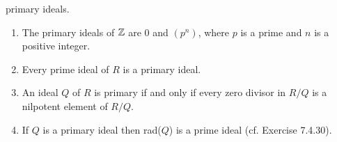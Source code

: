 \begin{enumerate}
                  primary ideals.
                  \begin{enumerate}
                     \item The primary ideals of $\mathbb{Z}$ are 0 and $(p^n)$, where
                           $p$ is a prime and $n$ is a positive integer.
                     \item Every prime ideal of $R$ is a primary ideal.
                     \item An ideal $Q$ of $R$ is primary if and only if every
                           zero divisor in $R/Q$ is a nilpotent element of
                           $R/Q$.
                     \item If $Q$ is a primary ideal then rad($Q$) is a prime
                           ideal (cf. Exercise 7.4.30).
                  \end{enumerate}
\end{enumerate}
